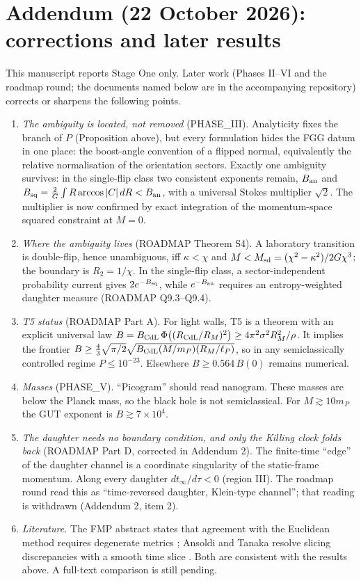 \documentclass[11pt,a4paper]{article}
\theoremstyle{remark}\newtheorem{remark}[theorem]{Remark}
\begin{document}
\section*{Addendum (22 October 2026): corrections and later results}
This manuscript reports Stage One only. Later work (Phases II--VI and the roadmap round; the documents named below are in the
accompanying repository) corrects or sharpens the following points.
\begin{enumerate}
\item \emph{The ambiguity is located, not removed} (PHASE\_III). Analyticity fixes the branch of $P$ (Proposition above), but every formulation
hides the FGG datum in one place: the boost-angle convention of a flipped normal, equivalently the relative normalisation of the orientation
sectors. Exactly one ambiguity survives: in the single-flip class two consistent exponents remain, $B_{\rm an}$ and
$B_{\rm sq}=\frac2G\int R\arccos|C|\,dR<B_{\rm an}$, with a universal Stokes multiplier $\sqrt2$. The multiplier is now confirmed by exact integration of the
momentum-space squared constraint at $M=0$.
\item \emph{Where the ambiguity lives} (ROADMAP Theorem S4). A laboratory transition is double-flip, hence unambiguous, iff $\kappa<\chi$ and
$M<M_{\rm sd}=(\chi^2-\kappa^2)/2G\chi^3$; the boundary is $R_2=1/\chi$. In the single-flip class, a sector-independent probability current gives
$2e^{-B_{\rm sq}}$, while $e^{-B_{\rm an}}$ requires an entropy-weighted daughter measure (ROADMAP Q9.3--Q9.4).
\item \emph{T5 status} (ROADMAP Part A). For light walls, T5 is a theorem with an explicit universal law
$B=B_{\rm CdL}\,\Phi\big((R_{\rm CdL}/R_M)^2\big)\ge4\pi^2\sigma^2R_M^2/\rho$. It implies the frontier
$B\ge\frac43\sqrt{\pi/2}\sqrt{B_{\rm CdL}(M/m_P)(R_M/\ell_P)}$, so in any semiclassically controlled regime $P\le10^{-23}$. Elsewhere $B\ge0.564\,B(0)$ remains
numerical.
\item \emph{Masses} (PHASE\_V). ``Picogram'' should read nanogram. These masses are below the Planck mass, so the black hole is not semiclassical. For
$M\gtrsim10m_P$ the GUT exponent is $B\gtrsim7\times10^4$.
\item \emph{The daughter needs no boundary condition, and only the Killing clock folds back} (ROADMAP Part D, corrected in Addendum 2). The finite-time
``edge'' of the daughter channel is a coordinate singularity of the static-frame momentum. Along every daughter $dt_\infty/d\tau<0$ (region III). The
roadmap round read this as ``time-reversed daughter, Klein-type channel''; that reading is withdrawn (Addendum 2, item 2).
\item \emph{Literature.} The FMP abstract states that agreement with the Euclidean method requires degenerate metrics \cite{FMP}; Ansoldi and Tanaka resolve
slicing discrepancies with a smooth time slice \cite{AT}. Both are consistent with the results above. A full-text comparison is still pending.
\end{enumerate}
\end{document}
